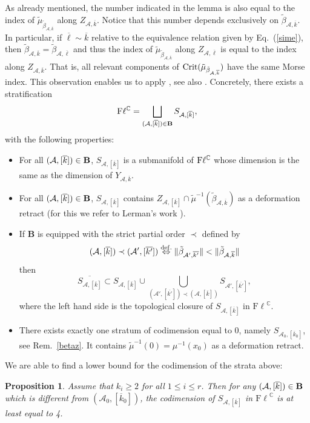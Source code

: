 \documentclass[12pt]{amsart}
\newtheorem{prop}[thm]{Proposition}
\theoremstyle{definition}
\theoremstyle{remark}
\newcommand{\CC}{\mathbb C}
\newcommand{\vk}{\overline{k}}
\newcommand{\A}{{\mathcal A}}
\newcommand{\Fl}{{\mathrm{F\ell}}}
\newcommand{\be}{\A, \vk}
\begin{document}
 
 As already mentioned, the number indicated in the lemma is also equal to the index of $\tilde{\mu}_{\tilde{\beta}_{\A, \vk}}$ along  $Z_{\A, \overline{k}}$. Notice that this number depends exclusively on $\tilde{\beta}_{\A, \vk}$. In particular, if $\overline{\ell} \sim \vk$ relative to the equivalence relation given by Eq.~(\ref{sime}), then $ \tilde{\beta}_{\A, \vk}=\tilde{\beta}_{\A, \overline{\ell}}$ and thus the index of $\tilde{\mu}_{\tilde{\beta}_{\A, \vk}}$   
 along $Z_{\A, \overline{\ell}}$ is equal to the index along $Z_{\A, \overline{k}}$. That is, all relevant components of ${\rm Crit}(\tilde{\mu}_{\tilde{\beta}_{\A, \vk}})$ have the same Morse index. This observation enables us to apply   \cite[Thm.~4.16]{Ki}, see also \cite[Sect.~3.1]{BaHe}.
Concretely,  there exists a stratification
\begin{equation} \label{stratif} {\rm F}\ell^\CC = \bigsqcup_{(\A, [\vk]) \in {\bf B}}S_{\A, [\vk]},\end{equation} 
 with the following properties:
 \begin{itemize}
 \item For all $(\A, [\vk]) \in {\bf B}$, $S_{\A, [\vk]}$ is a submanifold of ${\rm F} \ell^\CC$ whose dimension is the same as the dimension of
 $Y_{\be}$.
 \item For all $(\A, [\vk]) \in {\bf B}$, $S_{\A, [\vk]}$ contains $Z_{{\A,[\overline{k}]}} \cap \tilde{\mu}^{-1}(\tilde{\beta}_{\A,\overline{k}})$ as a deformation retract (for this we refer to Lerman's work \cite{Le}).
 \item If {\bf B} is equipped with the strict partial order $\prec$ defined by
 $$ (\A, [\vk]) \prec (\A', [\overline{k'}]) \stackrel{{\rm def.}}{\Leftrightarrow} \|\tilde{\beta}_{\A', \overline{k'}}\| < \|\tilde{\beta}_{\A, \vk}\|$$ then 
 $$\overline{S_{\A,[\vk]}} \subset S_{\A,[\vk]}\cup \bigcup_{(\A', [\overline{k'}]) \prec (\A, [\vk]) }S_{\A', [\overline{k'}]},$$ where the left hand side is the topological closure of 
 $S_{\A,[\vk]}$ in
 $\Fl^\CC$. 
 \item There exists exactly one stratum of  codimension equal to 0, namely $S_{\A_0, [\vk_0]}$, see Rem.~\ref{betaz}.  It contains 
 $\tilde{\mu}^{-1}(0)=\mu^{-1}(x_0)$ as a deformation retract. 
 \end{itemize}

We are able to find a lower bound for the codimension of the strata above:

\begin{prop} \label{codimc}
Assume that $k_i \ge 2$ for all $1\le i \le r$. Then for any $(\A, [\vk] )\in {\bf B}$ which is different from $(\A_0, [\vk_0])$, the codimension of $S_{\A, [\vk]}$ in $\Fl^\CC$ is at least equal to 4. 
\end{prop}
\end{document}
